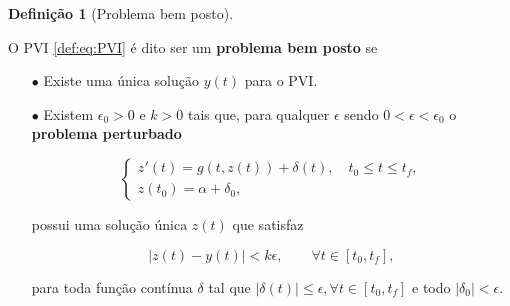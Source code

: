 \documentclass{beamer}
\theoremstyle{plain}
\theoremstyle{definition}
\newtheorem{defi}{Definição}
\begin{document}
\begin{frame}
    \footnotesize 
    \begin{defi}[Problema bem posto]
         \label{def:3:problema_bem_posto}
            
         O PVI \eqref{def:eq:PVI} é dito ser um \textbf{problema bem posto} se 
         \begin{itemize}
             \item[$\bullet$] Existe uma única solução $y(t)$ para o PVI.
         \item[$\bullet$] Existem  $\epsilon_0 > 0$ e $k>0$ tais que, para qualquer $\epsilon $ sendo $0 < \epsilon < \epsilon_0$ o \textbf{problema perturbado}


         \begin{equation*}
             \begin{cases}
                 z'(t) = g(t, z(t))+\delta(t), \quad  t_0 \leq t \leq t_f, \\
                 z(t_0)=\alpha+\delta_0,
             \end{cases}
         \end{equation*}

         possui uma solução única $z(t)$ que satisfaz

         \begin{equation*}
             |z(t)-y(t)|<k \epsilon, \qquad \forall t \in [t_0, t_f],
         \end{equation*} 
        
         para toda função contínua $\delta$ tal que $|\delta(t)| \leq \epsilon, \forall t \in [t_0, t_f]$ e todo $|\delta_0| < \epsilon$.
         \end{itemize}

     \end{defi}
\end{frame}

\end{document}

